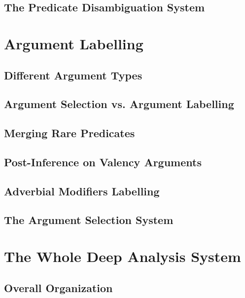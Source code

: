 \documentclass[12pt,notitlepage]{report}
\begin{document}
\section{The Predicate Disambiguation System}

\chapter{Argument Labelling}\label{ac}
\section{Different Argument Types}
\section{Argument Selection vs. Argument Labelling}
\section{Merging Rare Predicates}
\section{Post-Inference on Valency Arguments}
\section{Adverbial Modifiers Labelling}
\section{The Argument Selection System}

\chapter{The Whole Deep Analysis System}\label{setup}
\section{Overall Organization}
\end{document}

